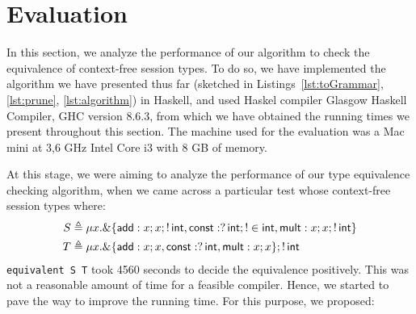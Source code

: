\section{Evaluation}
\label{sec:evaluation}

In this section, we analyze the performance of our algorithm
to check the equivalence of context-free session types. 
To do so, we have implemented the algorithm we have presented
thus far (sketched in Listings~\ref{lst:toGrammar}, 
\ref{lst:prune}, \ref{lst:algorithm}) 
in Haskell, and used Haskel compiler 
Glasgow Haskell Compiler, GHC version 8.6.3, from which we have 
obtained the running times we present throughout this section.
The machine used for the evaluation was a Mac mini at 3,6 GHz Intel 
Core i3 with 8 GB of memory. 

At this stage, we were aiming to analyze the performance of
our type equivalence checking algorithm, when we came across 
a particular test whose context-free session types where:
\begin{equation}
	\begin{aligned}
		S &\triangleq \mu x . \&\{ \mathsf{add}: x;x; !\,\mathsf{int},
							       \mathsf{const}: ?\,\mathsf{int};!\in\mathsf{int},
							       \mathsf{mult}: x;x;!\,\mathsf{int}\}\\
		T &\triangleq \mu x . \&\{ \mathsf{add}: x;x,
							  	   \mathsf{const}: ?\,\mathsf{int},
							       \mathsf{mult}: x;x\}; !\,\mathsf{int}
	\end{aligned}
\end{equation}
\lstinline{equivalent S T} took 4560 seconds to decide the equivalence
positively. This was not a reasonable amount of time for a
feasible compiler. Hence, we started to pave the way to improve the
running time. For this purpose, we proposed: